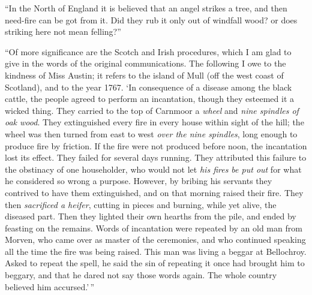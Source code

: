 \documentclass[a4paper, 11pt, oneside, polutonikogreek, english]{article}
\begin{document}
``In the North of England it is believed that an angel strikes a tree, and then need-fire can be got from it. Did they rub it only out of windfall wood? or does striking here not mean felling?''

``Of more significance are the Scotch and Irish procedures, which I am glad to give in the words of the original communications. The following I owe to the kindness of Miss Austin; it refers to the island of Mull (off the west coast of Scotland), and to the year 1767. `In consequence of a disease among the black cattle, the people agreed to perform an incantation, though they esteemed it a wicked thing. They carried to the top of Carnmoor a \emph{wheel} and \emph{nine spindles of oak wood}. They extinguished every fire in every house within sight of the hill; the wheel was then turned from east to west \emph{over the nine spindles}, long enough to produce fire by friction. If the fire were not produced before noon, the incantation lost its effect. They failed for several days running. They attributed this failure to the obstinacy of one householder, who would not let \emph{his fires be put out} for what he considered so wrong a purpose. However, by bribing his servants they contrived to have them extinguished, and on that morning raised their fire. They then \emph{sacrificed a heifer}, cutting in pieces and burning, while yet alive, the diseased part. Then they lighted their own hearths from the pile, and ended by feasting on the remains. Words of incantation were repeated by an old man from Morven, who came over as master of the ceremonies, and who continued speaking all the time the fire was being raised. This man was living a beggar at Bellochroy. Asked to repeat the spell, he said the sin of repeating it once had brought him to beggary, and that he dared not say those words again. The whole country believed him accursed.'\,''
\end{document}

